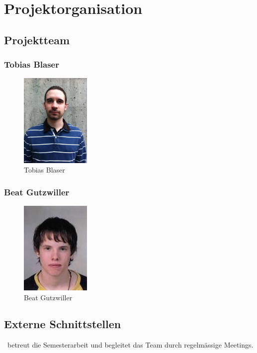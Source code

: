 \chapter{Projektorganisation}

\section{Projektteam}
\subsection*{Tobias Blaser}
\begin{figure}[H]
	\includegraphics[width=0.3\textwidth]{img/tobias.jpg}
	\centering
	\caption{Tobias Blaser}
	\label{fig:tobias}
\end{figure}

\subsection*{Beat Gutzwiller}
\begin{figure}[H]
	\includegraphics[width=0.3\textwidth]{img/beat.jpg}
	\centering
	\caption{Beat Gutzwiller}
	\label{fig:beat}
\end{figure}

\section{Externe Schnittstellen}
\teacher\ betreut die Semesterarbeit und begleitet das Team durch regelmässige Meetings.
